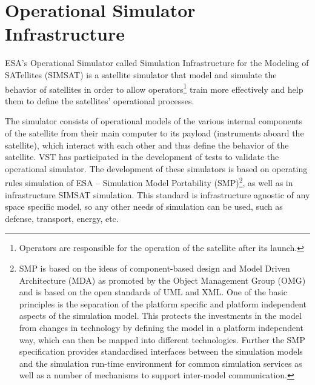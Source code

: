 \section{Operational Simulator Infrastructure}
ESA's Operational Simulator called Simulation Infrastructure for the Modeling of SATellites (SIMSAT) is a satellite simulator that model and simulate
the behavior of satellites in order to allow operators\footnote{Operators are responsible for the operation of the satellite after its launch.} train more effectively 
and help them to define the satellites' operational processes.

The simulator consists of operational models of the various internal components of the satellite from their main computer to its payload (instruments aboard the satellite),
which interact with each other and thus define the behavior of the satellite.
VST has participated in the development of tests to validate the operational simulator.
The development of these simulators is based on operating rules simulation of
ESA -- Simulation Model Portability (SMP)\footnote{SMP is based on the ideas of component-based design and Model Driven Architecture (MDA)
as promoted by the Object Management Group (OMG) and is based on the open standards of UML and XML.
One of the basic principles is the separation of the platform specific and platform independent aspects of the simulation model.
This protects the investments in the model from changes in technology by defining the model in a platform independent way, which can then be mapped into different technologies.
Further the SMP specification provides standardised interfaces between the simulation models and the simulation run-time environment for common simulation services as well as a
number of mechanisms to support inter-model communication.\cite{1A,2A,3A,4A,5A}}, as well as in infrastructure SIMSAT simulation.
This standard is infrastructure agnostic of any space specific model, so any other needs of simulation can be used, such as defense, transport, energy, etc.\\

